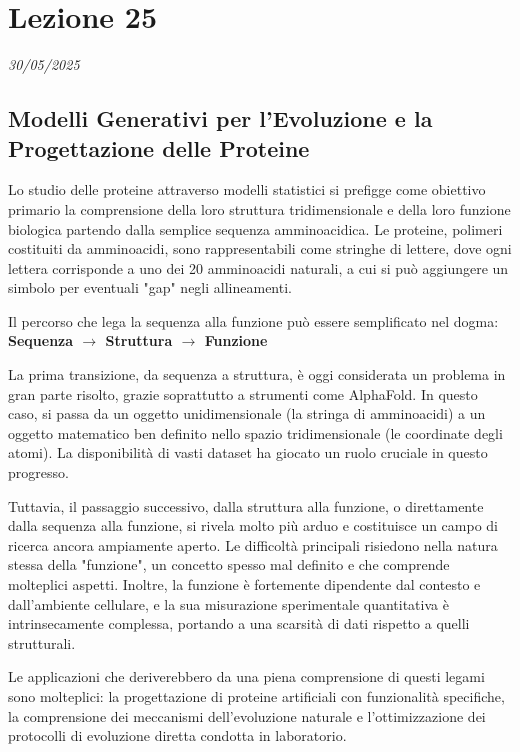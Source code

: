 \chapter{Lezione 25}
\label{capitolo_25}
\textit{30/05/2025}

\section{Modelli Generativi per l'Evoluzione e la Progettazione delle Proteine}
Lo studio delle proteine attraverso modelli statistici si prefigge come obiettivo primario la comprensione della loro struttura tridimensionale e della loro funzione biologica partendo dalla semplice sequenza amminoacidica. Le proteine, polimeri costituiti da amminoacidi, sono rappresentabili come stringhe di lettere, dove ogni lettera corrisponde a uno dei 20 amminoacidi naturali, a cui si può aggiungere un simbolo per eventuali "gap" negli allineamenti.

Il percorso che lega la sequenza alla funzione può essere semplificato nel dogma:
\textbf{Sequenza $\rightarrow$ Struttura $\rightarrow$ Funzione}

La prima transizione, da sequenza a struttura, è oggi considerata un problema in gran parte risolto, grazie soprattutto a strumenti come AlphaFold. In questo caso, si passa da un oggetto unidimensionale (la stringa di amminoacidi) a un oggetto matematico ben definito nello spazio tridimensionale (le coordinate degli atomi). La disponibilità di vasti dataset ha giocato un ruolo cruciale in questo progresso.

Tuttavia, il passaggio successivo, dalla struttura alla funzione, o direttamente dalla sequenza alla funzione, si rivela molto più arduo e costituisce un campo di ricerca ancora ampiamente aperto. Le difficoltà principali risiedono nella natura stessa della "funzione", un concetto spesso mal definito e che comprende molteplici aspetti. Inoltre, la funzione è fortemente dipendente dal contesto e dall'ambiente cellulare, e la sua misurazione sperimentale quantitativa è intrinsecamente complessa, portando a una scarsità di dati rispetto a quelli strutturali.

Le applicazioni che deriverebbero da una piena comprensione di questi legami sono molteplici: la progettazione di proteine artificiali con funzionalità specifiche, la comprensione dei meccanismi dell'evoluzione naturale e l'ottimizzazione dei protocolli di evoluzione diretta condotta in laboratorio.

